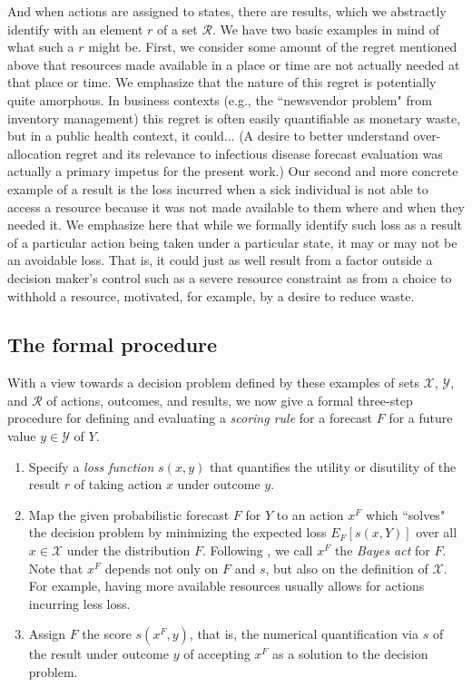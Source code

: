 \documentclass{article}
\begin{document}
And when actions are assigned to states, there are results, which we abstractly identify with an element $r$ of a set $\mathcal{R}$. We have two basic examples in mind of what such a $r$ might be.   First, we consider some amount of the regret mentioned above that resources made available in a place or time are not actually needed at that place or time. We emphasize that the nature of this regret is potentially quite amorphous.  In business contexts (e.g., the ``newsvendor problem" from inventory management) this regret is often easily quantifiable as monetary waste, but in a public health context, it could... (A desire to better understand over-allocation regret and its relevance to infectious disease forecast evaluation was actually a primary impetus for the present work.) 
Our second and more concrete example of a result is the loss incurred when a sick individual is not able to access a resource because it was not made available to them where and when they needed it.   We emphasize here that while we formally identify such loss as a result of a particular action being taken under a particular state, it may or may not be an avoidable loss.  That is, it could just as well result from a factor outside a decision maker's control such as a severe resource constraint as from a choice to withhold a resource, motivated, for example, by a desire to reduce waste.

\subsection{The formal procedure}

With a view towards a decision problem defined by these examples of sets $\mathcal{X}$, $\mathcal{Y}$, and $\mathcal{R}$ of actions, outcomes, and results, we now give a formal three-step procedure for defining and evaluating a \emph{scoring rule} for a forecast $F$ for a future value $y \in \mathcal{Y}$ of $Y$.

\begin{enumerate}
\item Specify a \emph{loss function} $s(x,y)$ that quantifies the utility or disutility of the result $r$ of taking action $x$ under outcome $y$.
\item Map the given probabilistic forecast $F$ for $Y$ to an action $x^F$ which ``solves" the decision problem by minimizing the expected loss $E_{F}[s(x,Y)]$ over all $x \in \mathcal{X}$ under the distribution $F$.  Following \cite{dawid2007geometry}, we call $x^F$ the \emph{Bayes act} for $F$. Note that $x^F$ depends not only on $F$ and $s$, but also on the definition of $\mathcal{X}$. For example, having more available resources usually allows for actions incurring less loss.   
\item Assign $F$ the score $s(x^F,y)$, that is, the numerical quantification via $s$ of the result under outcome $y$ of accepting $x^F$ as a solution to the decision problem.
\end{enumerate}{}
\end{document}
